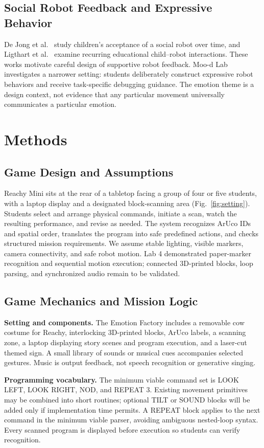 \documentclass[conference,12pt,letterpaper]{IEEEtran}
\begin{document}
\subsection{Social Robot Feedback and Expressive Behavior}
De Jong et al.~\cite{paper2} study children's acceptance of a social robot over time, and Ligthart et al.~\cite{paper3} examine recurring educational child--robot interactions. These works motivate careful design of supportive robot feedback. Moo-d Lab investigates a narrower setting: students deliberately construct expressive robot behaviors and receive task-specific debugging guidance. The emotion theme is a design context, not evidence that any particular movement universally communicates a particular emotion.

\section{Methods}
\subsection{Game Design and Assumptions}
Reachy Mini sits at the rear of a tabletop facing a group of four or five students, with a laptop display and a designated block-scanning area (Fig.~\ref{fig:setting}). Students select and arrange physical commands, initiate a scan, watch the resulting performance, and revise as needed. The system recognizes ArUco IDs and spatial order, translates the program into safe predefined actions, and checks structured mission requirements. We assume stable lighting, visible markers, camera connectivity, and safe robot motion. Lab 4 demonstrated paper-marker recognition and sequential motion execution; connected 3D-printed blocks, loop parsing, and synchronized audio remain to be validated.

\subsection{Game Mechanics and Mission Logic}
\textbf{Setting and components.} The Emotion Factory includes a removable cow costume for Reachy, interlocking 3D-printed blocks, ArUco labels, a scanning zone, a laptop displaying story scenes and program execution, and a laser-cut themed sign. A small library of sounds or musical cues accompanies selected gestures. Music is output feedback, not speech recognition or generative singing.

\textbf{Programming vocabulary.} The minimum viable command set is LOOK LEFT, LOOK RIGHT, NOD, and REPEAT 3. Existing movement primitives may be combined into short routines; optional TILT or SOUND blocks will be added only if implementation time permits. A REPEAT block applies to the next command in the minimum viable parser, avoiding ambiguous nested-loop syntax. Every scanned program is displayed before execution so students can verify recognition.
\end{document}
